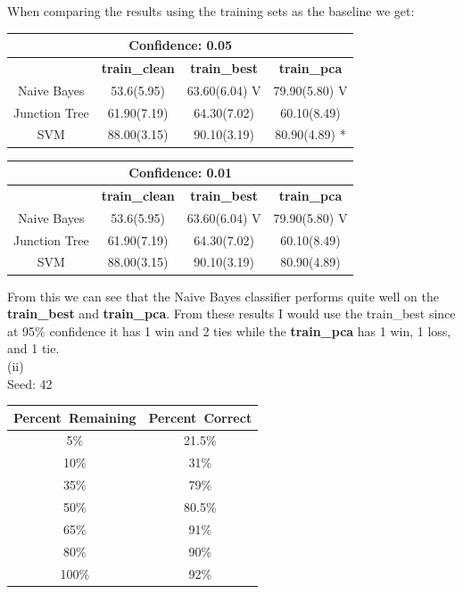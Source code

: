 \documentclass{report}
\begin{document}
When comparing the results using the training sets as the baseline we
get:
\begin{center}
  \begin{tabular}{|c|c|c|c|}
    \hline
    \multicolumn{4}{|c|}{{\bf Confidence: 0.05}}\\
    \hline
    & {\bf train\_clean} & {\bf train\_best} & {\bf train\_pca}\\
    \hline
    Naive Bayes & 53.6(5.95) & 63.60(6.04) V & 79.90(5.80) V\\
    \hline
    Junction Tree & 61.90(7.19) & 64.30(7.02) & 60.10(8.49)\\
    \hline
    SVM & 88.00(3.15) & 90.10(3.19) & 80.90(4.89) *\\
    \hline
  \end{tabular}
\end{center}
\begin{center}
  \begin{tabular}{|c|c|c|c|}
    \multicolumn{4}{|c|}{{\bf Confidence: 0.01}}\\
    \hline
    & {\bf train\_clean} & {\bf train\_best} & {\bf train\_pca}\\
    \hline
    Naive Bayes & 53.6(5.95) & 63.60(6.04) V & 79.90(5.80) V\\
    \hline
    Junction Tree & 61.90(7.19) & 64.30(7.02) & 60.10(8.49)\\
    \hline
    SVM & 88.00(3.15) & 90.10(3.19) & 80.90(4.89)\\
    \hline
  \end{tabular}
\end{center}
From this we can see that the Naive Bayes classifier performs quite
well on the {\bf train\_best} and {\bf train\_pca}. From these results
I would use the train\_best since at 95\% confidence it has 1 win and 2
ties while the {\bf train\_pca} has 1 win, 1 loss, and 1 tie.\\
(ii)\\
Seed: 42\\
\begin{center}
  \begin{tabular}{|c|c|}
    \hline    
    Percent\ Remaining & Percent\ Correct\\
    \hline
    5\% & 21.5\%\\
    \hline
    10\% & 31\%\\
    \hline
    35\% & 79\%\\
    \hline
    50\% & 80.5\%\\
    \hline
    65\% & 91\%\\
    \hline
    80\% & 90\%\\
    \hline
    100\% & 92\%\\
    \hline
  \end{tabular}
\end{center}
\end{document}
